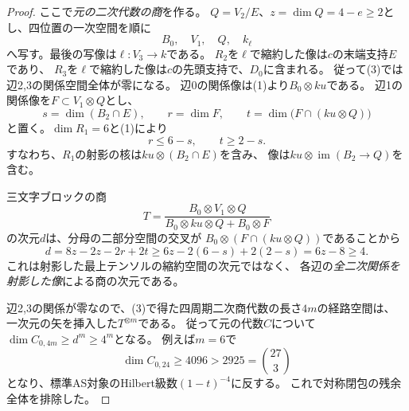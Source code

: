 \begin{proof}
ここで\emph{元の二次代数の商}を作る。
$Q=V_2/E$、$z=\dim Q=4-e\ge2$とし、四位置の一次空間を順に
\[
                        B_0,\quad V_1,\quad Q,\quad k_\ell              \tag{3}
\]
へ写す。最後の写像は$\ell:V_3\to k$である。
$R_2$を$\ell$で縮約した像は$c$の末端支持$E$であり、
$R_3$を$\ell$で縮約した像は$c$の先頭支持で、$D_0$に含まれる。
従って(3)では辺2,3の関係空間全体が零になる。
辺0の関係像は(1)より$B_0\otimes ku$である。
辺1の関係像を$F\subset V_1\otimes Q$とし、
\[
 s=\dim(B_2\cap E),\qquad r=\dim F,\qquad
 t=\dim\bigl(F\cap(ku\otimes Q)\bigr)
\]
と置く。$\dim R_1=6$と(1)により
\[
                             r\le6-s,\qquad t\ge2-s.                    \tag{4}
\]
すなわち、$R_1$の射影の核は$ku\otimes(B_2\cap E)$を含み、
像は$ku\otimes\operatorname{im}(B_2\to Q)$を含む。

三文字ブロックの商
\[
 T=\frac{B_0\otimes V_1\otimes Q}
          {B_0\otimes ku\otimes Q+B_0\otimes F}
\]
の次元$d$は、分母の二部分空間の交叉が
$B_0\otimes(F\cap(ku\otimes Q))$であることから
\[
 d=8z-2z-2r+2t
   \ge 6z-2(6-s)+2(2-s)
   =6z-8\ge4.                                                        \tag{5}
\]
これは射影した最上テンソルの縮約空間の次元ではなく、
各辺の\emph{全二次関係を射影した像}による商の次元である。

辺2,3の関係が零なので、(3)で得た四周期二次商代数の長さ$4m$の経路空間は、
一次元の矢を挿入した$T^{\otimes m}$である。
従って元の代数$C$について$\dim C_{0,4m}\ge d^m\ge4^m$となる。
例えば$m=6$で
\[
               \dim C_{0,24}\ge4096>2925=\binom{27}{3}
\]
となり、標準AS対象のHilbert級数$(1-t)^{-4}$に反する。
これで対称閉包の残余全体を排除した。
\end{proof}
